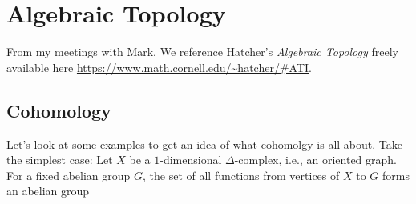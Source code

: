 \chapter{Algebraic Topology}
From my meetings with Mark. We reference Hatcher's \emph{Algebraic
  Topology} \cite{hatcher} freely available here
\url{https://www.math.cornell.edu/~hatcher/#ATI}.

\section{Cohomology}
Let's look at some examples to get an idea of what cohomolgy is all
about. Take the simplest case: Let \(X\) be a \(1\)-dimensional
\(\Delta\)-complex, i.e., an oriented graph. For a fixed abelian group
\(G\), the set of all functions from vertices of \(X\) to \(G\) forms an
abelian group

